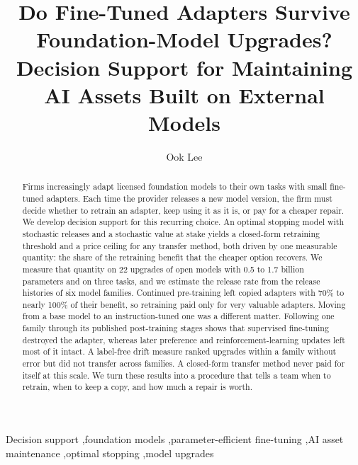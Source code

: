 \documentclass[preprint,12pt,authoryear]{elsarticle}
\newcommand{\todo}[1]{\textcolor{red}{[#1]}}
\begin{document}
\begin{frontmatter}

\title{Do Fine-Tuned Adapters Survive Foundation-Model Upgrades? Decision Support for Maintaining AI Assets Built on External Models}

\author[inst1]{Ook Lee}
\cortext[cor1]{Corresponding author. E-mail: \todo{to be added}}
\address[inst1]{Department of Information System, Hanyang University, Seoul, Republic of Korea}

\begin{abstract}
Firms increasingly adapt licensed foundation models to their own tasks with small fine-tuned adapters. Each time the provider releases a new model version, the firm must decide whether to retrain an adapter, keep using it as it is, or pay for a cheaper repair. We develop decision support for this recurring choice. An optimal stopping model with stochastic releases and a stochastic value at stake yields a closed-form retraining threshold and a price ceiling for any transfer method, both driven by one measurable quantity: the share of the retraining benefit that the cheaper option recovers. We measure that quantity on 22 upgrades of open models with 0.5 to 1.7 billion parameters and on three tasks, and we estimate the release rate from the release histories of six model families. Continued pre-training left copied adapters with 70\% to nearly 100\% of their benefit, so retraining paid only for very valuable adapters. Moving from a base model to an instruction-tuned one was a different matter. Following one family through its published post-training stages shows that supervised fine-tuning destroyed the adapter, whereas later preference and reinforcement-learning updates left most of it intact. A label-free drift measure ranked upgrades within a family without error but did not transfer across families. A closed-form transfer method never paid for itself at this scale. We turn these results into a procedure that tells a team when to retrain, when to keep a copy, and how much a repair is worth.
\end{abstract}

\begin{keyword}
Decision support \sep foundation models \sep parameter-efficient fine-tuning \sep AI asset maintenance \sep optimal stopping \sep model upgrades
\end{keyword}

\end{frontmatter}


\end{document}
